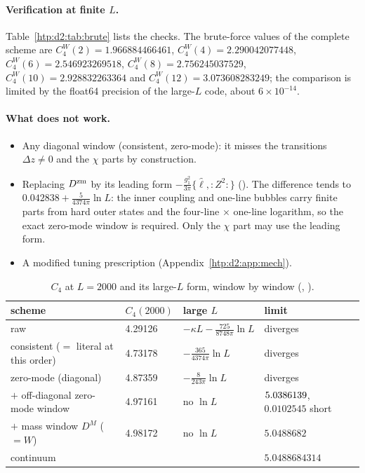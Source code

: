 \paragraph{Verification at finite $L$.} Table~\ref{htp:d2:tab:brute} lists the checks. The brute-force values of the complete
scheme are $C_4^W(2)=1.966884466461$, $C_4^W(4)=2.290042077448$, $C_4^W(6)=2.546923269518$, $C_4^W(8)=2.756245037529$,
$C_4^W(10)=2.928832263364$ and $C_4^W(12)=3.073608283249$; the comparison is limited by the float64 precision of the
large-$L$ code, about $6\times10^{-14}$.

\paragraph{What does not work.}
\begin{itemize}
\item Any diagonal window (consistent, zero-mode): it misses the transitions $\Delta z\neq0$ and the $\chi$ parts by
 construction.
\item Replacing $D^{\rm zm}$ by its leading form $-\frac{g_1^2}{3\pi}\{\hat\ell,{:}Z^2{:}\}$ (). The
 difference tends to $0.042838+\frac5{4374\pi}\ln L$: the inner coupling and one-line bubbles carry finite parts from hard
 outer states and the four-line $\times$ one-line logarithm, so the exact zero-mode window is required. Only the $\chi$ part
 may use the leading form.
\item A modified tuning prescription (Appendix~\ref{htp:d2:app:mech}).
\end{itemize}

\begin{table}[ht]
\centering\footnotesize\renewcommand{\arraystretch}{1.15}
\begin{tabular}{@{}p{5.6cm}lp{4.3cm}p{3.2cm}@{}}
\toprule
scheme & $C_4(2000)$ & large $L$ & limit \\\midrule
raw & 4.29126 & $-\kappa L-\frac{725}{8748\pi}\ln L$ & diverges \\
consistent ($=$ literal at this order) & 4.73178 & $-\frac{365}{4374\pi}\ln L$ & diverges \\
zero-mode (diagonal) & 4.87359 & $-\frac8{243\pi}\ln L$ & diverges \\
$+$ off-diagonal zero-mode window & 4.97161 & no $\ln L$ & $5.0386139$, $0.0102545$ short \\
$+$ mass window $D^M$ ($=W$) & 4.98172 & no $\ln L$ & $5.0488682$ \\
\midrule
continuum & & & $5.0488684314$ \\
\bottomrule
\end{tabular}
\caption{$C_4$ at $L=2000$ and its large-$L$ form, window by window (,
).}
\label{htp:d2:tab:c4w}
\end{table}

